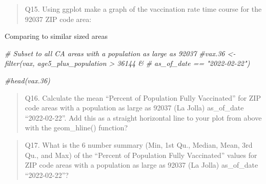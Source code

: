 \documentclass[
]{article}
\newenvironment{Shaded}{\begin{snugshade}}{\end{snugshade}}
\newcommand{\CommentTok}[1]{\textcolor[rgb]{0.56,0.35,0.01}{\textit{#1}}}
\begin{document}
\begin{quote}
Q15. Using ggplot make a graph of the vaccination rate time course for
the 92037 ZIP code area:
\end{quote}

\begin{Shaded}
\end{Shaded}

Comparing to similar sized areas

\begin{Shaded}
\begin{Highlighting}[]
\CommentTok{\# Subset to all CA areas with a population as large as 92037}
\CommentTok{\#vax.36 \textless{}{-} filter(vax, age5\_plus\_population \textgreater{} 36144 \&}
\CommentTok{\#                as\_of\_date == "2022{-}02{-}22")}

\CommentTok{\#head(vax.36)}
\end{Highlighting}
\end{Shaded}

\begin{quote}
Q16. Calculate the mean ``Percent of Population Fully Vaccinated'' for
ZIP code areas with a population as large as 92037 (La Jolla)
as\_of\_date ``2022-02-22''. Add this as a straight horizontal line to
your plot from above with the geom\_hline() function?
\end{quote}

\begin{Shaded}
\end{Shaded}

\begin{quote}
Q17. What is the 6 number summary (Min, 1st Qu., Median, Mean, 3rd Qu.,
and Max) of the ``Percent of Population Fully Vaccinated'' values for
ZIP code areas with a population as large as 92037 (La Jolla)
as\_of\_date ``2022-02-22''?
\end{quote}
\end{document}
